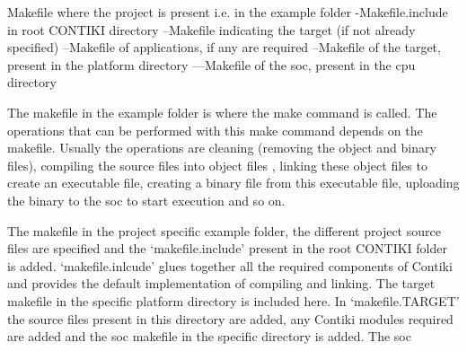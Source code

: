 Makefile where the project is present i.e. in the example folder
-Makefile.include in root CONTIKI directory
--Makefile indicating the target (if not already specified)
--Makefile of applications, if any are required
--Makefile of the target, present in the platform directory
---Makefile of the \gls{soc}, present in the cpu directory

The makefile in the example folder is where the make command is called. The operations that can be performed with this make command depends on the makefile. Usually the operations are cleaning (removing the object and binary files), compiling the source files into object files , linking these object files to create an executable file, creating a binary file from this executable file, uploading the binary to the \gls{soc} to start execution and so on. 

The makefile in the project specific example folder, the different project source files are specified and the `makefile.include' present in the root CONTIKI folder is added. `makefile.inlcude' glues together all the required components of Contiki and provides the default implementation of compiling and linking. The target makefile in the specific platform directory is included here. In `makefile.TARGET' the source files present in this directory are added, any Contiki modules required are added and the \gls{soc} makefile in the specific directory is added. The \gls{soc} 



